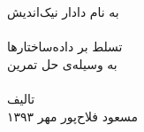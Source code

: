 \begin{titlepage}
\begin{center}
\nastaliq
به نام دادار نیک‌اندیش\\
\vspace{10ex}
\hrulefill\\[0.3cm]
{\Huge
تسلط بر داده‌ساختارها\\
}
به وسیله‌ی حل تمرین\\
\hrulefill\\
\vfill
تالیف
\\[0.4cm]
مسعود فلاح‌پور
\vfill
مهر ۱۳۹۳\\
\end{center}
\end{titlepage}